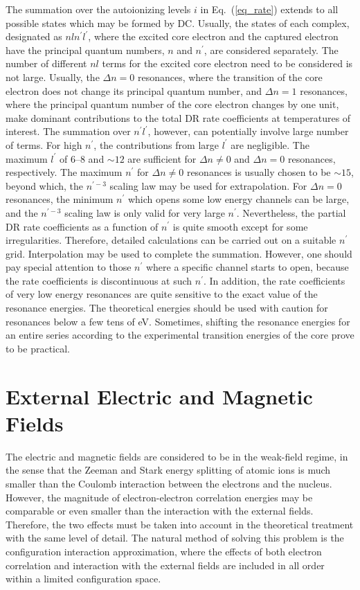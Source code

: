 The summation over the autoionizing levels $i$ in Eq.~(\ref{eq_rate})
extends to all possible states which may be formed by DC. Usually, the states
of each 
complex, designated as $nln^\prime l^\prime$, where the excited core electron
and the captured electron have the principal quantum numbers, $n$ and
$n^\prime$, are considered separately. 
The number of different $nl$ terms for the excited core
electron need to be considered is not large. Usually, the $\Delta n = 0$
resonances, where the transition of the core electron does not change its
principal quantum number, and $\Delta n = 1$ resonances, where the principal
quantum number of the core electron changes by one unit, make
dominant contributions to the 
total DR rate coefficients at temperatures of interest. The summation
over $n^\prime l^\prime$, however, can potentially involve large number of
terms. For high $n^\prime$, the contributions from large $l^\prime$ are
negligible. The maximum $l^\prime$ of 6--8 and $\sim 12$ are sufficient for
$\Delta n \ne 0$ and $\Delta n = 0$ resonances, respectively. The maximum
$n^\prime$ for $\Delta n \ne 0$ resonances is usually chosen to be $\sim 15$,
beyond which, the $n^{\prime -3}$ scaling law may be used for
extrapolation. For $\Delta n = 0$ resonances, the minimum $n^\prime$ which
opens some low energy channels can be large, and the $n^{\prime -3}$ scaling
law is only valid for very large $n^\prime$. Nevertheless, the partial DR rate
coefficients as a function of $n^\prime$ is quite smooth except for some
irregularities. Therefore, detailed 
calculations can be carried out on a suitable $n^\prime$ grid.
Interpolation may be used to complete the summation. However, one should pay
special attention to those $n^\prime$ where a specific channel starts to
open, because the rate coefficients is discontinuous at such $n^\prime$. In
addition, the rate coefficients of very low energy resonances are quite
sensitive to the exact value of the resonance energies. The theoretical
energies should be used with caution for resonances below a few tens of
eV. Sometimes, shifting the resonance energies for an entire series according
to the experimental transition energies of the core prove to be practical.

\section{External Electric and Magnetic Fields}
The electric and magnetic fields are considered to be in the weak-field regime,
in the sense that the  Zeeman and Stark energy splitting of atomic ions is much
smaller than the Coulomb interaction between the electrons and the nucleus.
However, the magnitude of electron-electron correlation energies may be
comparable or even smaller than the interaction with the external fields.
Therefore, the two effects must be taken into account in the theoretical
treatment with the same level of detail. The natural method of solving this
problem is the configuration interaction approximation, where the effects of
both electron correlation and interaction with the external fields are included
in all order within a limited configuration space.

